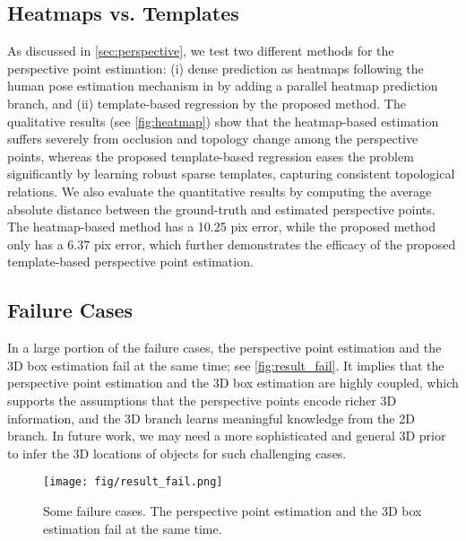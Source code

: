 \documentclass{article}
\begin{document}
\subsection{Heatmaps vs. Templates}

As discussed in \autoref{sec:perspective}, we test two different methods for the perspective point estimation: (i) dense prediction as heatmaps following the human pose estimation mechanism in \citet{he2017mask} by adding a parallel heatmap prediction branch, and (ii) template-based regression by the proposed method. The qualitative results (see \autoref{fig:heatmap}) show that the heatmap-based estimation suffers severely from occlusion and topology change among the perspective points, whereas the proposed template-based regression eases the problem significantly by learning robust sparse templates, capturing consistent topological relations. We also evaluate the quantitative results by computing the average absolute distance between the ground-truth and estimated perspective points. The heatmap-based method has a 10.25 pix error, while the proposed method only has a 6.37 pix error, which further demonstrates the efficacy of the proposed template-based perspective point estimation.


\subsection{Failure Cases}

In a large portion of the failure cases, the perspective point estimation and the 3D box estimation fail at the same time; see \autoref{fig:result_fail}. It implies that the perspective point estimation and the 3D box estimation are highly coupled, which supports the assumptions that the perspective points encode richer 3D information, and the 3D branch learns meaningful knowledge from the 2D branch. In future work, we may need a more sophisticated and general 3D prior to infer the 3D locations of objects for such challenging cases.

\begin{figure}[t!]
    \begin{center}
        \texttt{[image: fig/result\_fail.png]}
    \end{center}
    \vspace{-3pt}
    \caption{Some failure cases. The perspective point estimation and the 3D box estimation fail at the same time.}
    \label{fig:result_fail}
    \vspace{9pt}
\end{figure}
\end{document}
